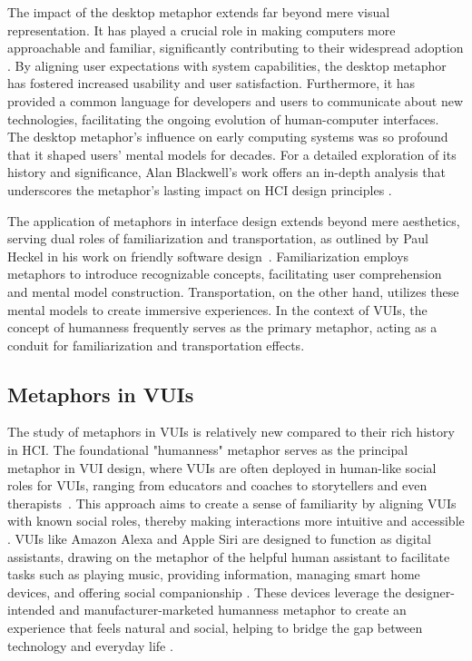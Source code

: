 The impact of the desktop metaphor extends far beyond mere visual representation. It has played a crucial role in making computers more approachable and familiar, significantly contributing to their widespread adoption \cite{Carroll_Mack_Kellogg_1988}. By aligning user expectations with system capabilities, the desktop metaphor has fostered increased usability and user satisfaction. Furthermore, it has provided a common language for developers and users to communicate about new technologies, facilitating the ongoing evolution of human-computer interfaces. The desktop metaphor's influence on early computing systems was so profound that it shaped users' mental models for decades. For a detailed exploration of its history and significance, Alan Blackwell's work offers an in-depth analysis that underscores the metaphor's lasting impact on HCI design principles \cite{Blackwell_2006}.




The application of metaphors in interface design extends beyond mere aesthetics, serving dual roles of familiarization and transportation, as outlined by Paul Heckel in his work on friendly software design~\cite{Heckel_1984}. Familiarization employs metaphors to introduce recognizable concepts, facilitating user comprehension and mental model construction. Transportation, on the other hand, utilizes these mental models to create immersive experiences. In the context of VUIs, the concept of humanness frequently serves as the primary metaphor, acting as a conduit for familiarization and transportation effects.



\subsection{Metaphors in VUIs}

The study of metaphors in VUIs is relatively new compared to their rich history in HCI. The foundational "humanness" metaphor serves as the principal metaphor in VUI design, where VUIs are often deployed in human-like social roles for VUIs, ranging from educators and coaches to storytellers and even therapists~\cite{Desai_Chin_2023, Jung_Kim_So_Kim_Oh_2019, Desai_Hu_Lundy_Chin_2023, Wang_Yang_Shao_Abdullah_Sundar_2020, Desai_Lundy_Chin_2023, Lee_Frank_IJsselsteijn_2021, Motalebi_Cho_Sundar_Abdullah_2019}. This approach aims to create a sense of familiarity by aligning VUIs with known social roles, thereby making interactions more intuitive and accessible \cite{McMillan_Jaber_2021, Desai_Twidale_2023}. VUIs like Amazon Alexa and Apple Siri are designed to function as digital assistants, drawing on the metaphor of the helpful human assistant to facilitate tasks such as playing music, providing information, managing smart home devices, and offering social companionship \cite{Sciuto_Saini_Forlizzi_Hong_2018}. These devices leverage the designer-intended and manufacturer-marketed \cite{Turk_2016} humanness metaphor to create an experience that feels natural and social, helping to bridge the gap between technology and everyday life \cite{Olmstead_2017, Auxier_2019}.

